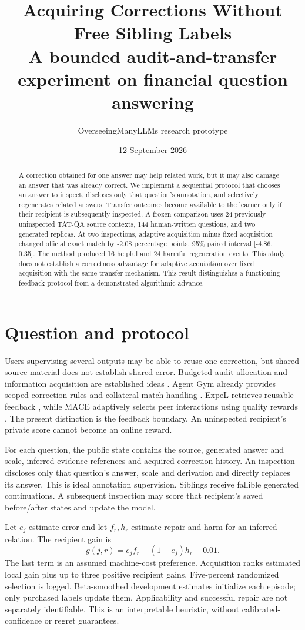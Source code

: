 \documentclass[10pt]{article}
\title{Acquiring Corrections Without Free Sibling Labels\\\large A bounded audit-and-transfer experiment on financial question answering}
\author{OverseeingManyLLMs research prototype}\date{12 September 2026}
\begin{document}
\maketitle
\begin{abstract}
A correction obtained for one answer may help related work, but it may also damage an answer that was already correct. We implement a sequential protocol that chooses an answer to inspect, discloses only that question's annotation, and selectively regenerates related answers. Transfer outcomes become available to the learner only if their recipient is subsequently inspected. A frozen comparison uses 24 previously uninspected TAT-QA source contexts, 144 human-written questions, and two generated replicas. At two inspections, adaptive acquisition minus fixed acquisition changed official exact match by -2.08 percentage points, 95\% paired interval [-4.86, 0.35]. The method produced 16 helpful and 24 harmful regeneration events. This study does not establish a correctness advantage for adaptive acquisition over fixed acquisition with the same transfer mechanism. This result distinguishes a functioning feedback protocol from a demonstrated algorithmic advance.
\end{abstract}
\section{Question and protocol}
Users supervising several outputs may be able to reuse one correction, but shared source material does not establish shared error. Budgeted audit allocation and information acquisition are established ideas \cite{fleet,knowledge}. Agent Gym already provides scoped correction rules and collateral-match handling \cite{gym}. ExpeL retrieves reusable feedback \cite{expel}, while MACE adaptively selects peer interactions using quality rewards \cite{mace}. The present distinction is the feedback boundary. An uninspected recipient's private score cannot become an online reward.

For each question, the public state contains the source, generated answer and scale, inferred evidence references and acquired correction history. An inspection discloses only that question's answer, scale and derivation and directly replaces its answer. This is ideal annotation supervision. Siblings receive fallible generated continuations. A subsequent inspection may score that recipient's saved before/after states and update the model.

Let $e_j$ estimate error and let $f_r,h_r$ estimate repair and harm for an inferred relation. The recipient gain is
\[g(j,r)=e_j f_r-(1-e_j)h_r-0.01.\]
The last term is an assumed machine-cost preference. Acquisition ranks estimated local gain plus up to three positive recipient gains. Five-percent randomized selection is logged. Beta-smoothed development estimates initialize each episode; only purchased labels update them. Applicability and successful repair are not separately identifiable. This is an interpretable heuristic, without calibrated-confidence or regret guarantees.
\end{document}
